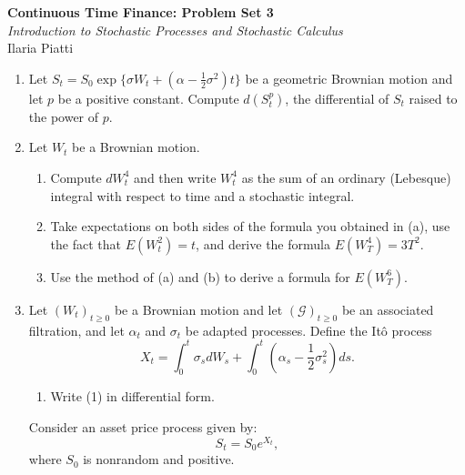 \documentclass[11pt,a4,table]{article}
\begin{document}
\vspace*{-0.7in}

\begin{center}
 \textbf{Continuous Time Finance: Problem Set 3} \\
 \textit{Introduction to Stochastic Processes and Stochastic Calculus} \\
Ilaria Piatti 
\end{center} 


\begin{enumerate}
    \item Let $S_t=S_0\exp\{\sigma W_t+(\alpha - \frac{1}{2}\sigma^2)t\}$ be a geometric Brownian motion and let $p$ be a positive constant. Compute $d(S_t^p)$, the differential of $S_t$ raised to the power of $p$.
    
    
    \item Let $W_t$ be a Brownian motion.
    
    \begin{enumerate}
        \item Compute $dW_t^4$ and then write $W_t^4$ as the sum of an ordinary (Lebesque) integral with respect to time and a stochastic integral.
        
        \item Take expectations on both sides of the formula you obtained in (a), use the fact that $E(W_t^2)=t$, and derive the formula $E(W_T^4)=3T^2$.
        
        \item Use the method of (a) and (b) to derive a formula for $E(W_T^6)$.
    \end{enumerate}
    
    
    \item Let $(W_t)_{t\geq 0}$ be a Brownian motion and let $(\mathcal{G})_{t\geq 0}$ be an associated filtration, and let $\alpha_t$ and $\sigma_t$ be adapted processes. Define the Itô process
    \begin{equation}
        X_t = \int_0^t \sigma_s dW_s + \int_0^t \left(\alpha_s -\frac{1}{2}\sigma_s^2 \right) ds.
    \end{equation}
    
    \begin{enumerate}
        \item Write (1) in differential form.
    \end{enumerate}
    
    Consider an asset price process given by:
    \begin{equation}
        S_t=S_0e^{X_t},
    \end{equation}
    where $S_0$ is nonrandom and positive.
    \begin{enumerate}
        \setcounter{enumii}{1}
    

\end{enumerate}
\end{enumerate}
\end{document}
